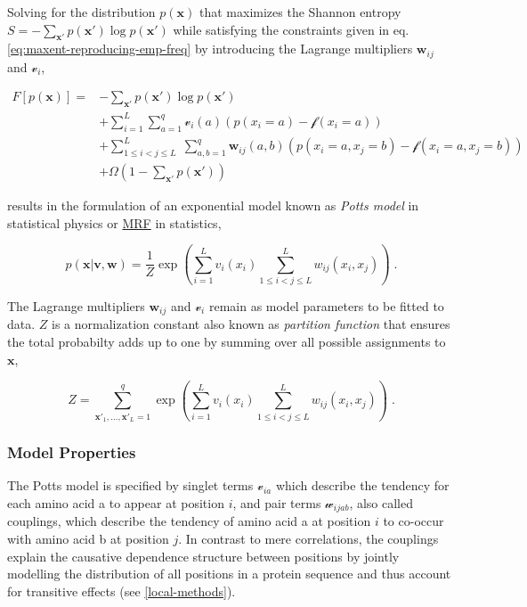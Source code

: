 \documentclass[12pt,a4paper,twoside]{book}
\newcommand{\eq}{\!=\!}
\newcommand{\seq}{\mathbf{x}}
\renewcommand{\v}{\mathbf{v}}
\newcommand{\vi}{\mathcal{v}_{i}}
\newcommand{\via}{\mathcal{v}_{ia}}
\newcommand{\w}{\mathbf{w}}
\newcommand{\wij}{\mathbf{w}_{ij}}
\newcommand{\wijab}{\mathcal{w}_{ijab}}
\theoremstyle{definition}
\theoremstyle{definition}
\theoremstyle{remark}
\begin{document}
Solving for the distribution \(p(\seq)\) that maximizes the Shannon
entropy \(S= -\sum_{\seq\prime} p(\seq\prime) \log p(\seq\prime)\) while
satisfying the constraints given in eq.
\eqref{eq:maxent-reproducing-emp-freq} by introducing the Lagrange
multipliers \(\wij\) and \(\vi\),

\begin{align}
F \left[ p(\seq) \right] =& -\sum_{\seq\prime} p(\seq\prime) \log p(\seq\prime) \\
        & + \sum_{i=1}^L \sum_{a=1}^{q} \vi(a) \left( p(x_i\eq a) - \mathcal{f}(x_i\eq a) \right) \\
        & + \sum_{1 \leq i < j \leq L}^L \; \sum_{a,b=1}^{q} \wij(a,b) \left( p(x_i\eq a, x_j \eq b) - \mathcal{f}(x_i\eq a, x_j\eq b) \right) \\
        & + \Omega \left( 1-\sum_{\seq\prime} p(\seq\prime)  \right)
\label{eq:derivation-max-ent-model}
\end{align}

results in the formulation of an exponential model known as \emph{Potts
model} in statistical physics or \protect\hyperlink{abbrev}{MRF} in
statistics,

\begin{equation}
    p(\seq | \v, \w ) = \frac{1}{Z} \exp \left( \sum_{i=1}^L v_i(x_i) \sum_{1 \leq i < j \leq L}^L w_{ij}(x_i, x_j) \right) \; .
\label{eq:max-ent-model}
\end{equation}

The Lagrange multipliers \(\wij\) and \(\vi\) remain as model parameters
to be fitted to data. \(Z\) is a normalization constant also known as
\emph{partition function} that ensures the total probabilty adds up to
one by summing over all possible assignments to \(\seq\),

\begin{equation}
  Z = \sum_{\seq\prime_1, \ldots, \seq\prime_L = 1}^{q} \exp  \left( \sum_{i=1}^L v_i(x_i) \sum_{1 \leq i < j \leq L}^L w_{ij}(x_i, x_j) \right) \; .
  \label{eq:partition-fct-likelihood}
\end{equation}

\subsubsection{Model Properties}\label{model-properties}

The Potts model is specified by singlet terms \(\via\) which describe
the tendency for each amino acid a to appear at position \(i\), and pair
terms \(\wijab\), also called couplings, which describe the tendency of
amino acid a at position \(i\) to co-occur with amino acid b at position
\(j\). In contrast to mere correlations, the couplings explain the
causative dependence structure between positions by jointly modelling
the distribution of all positions in a protein sequence and thus account
for transitive effects (see \ref{local-methods}).
\end{document}
